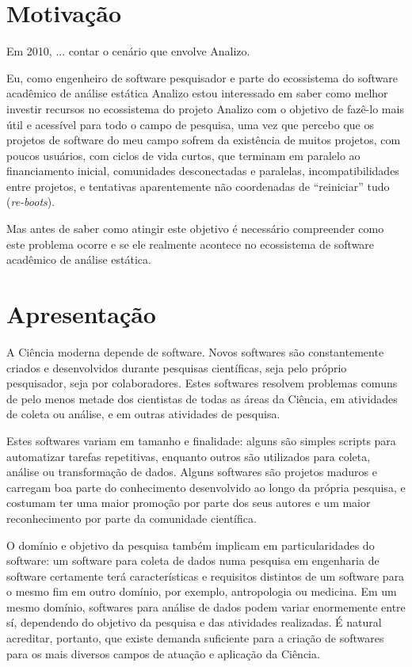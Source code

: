 
\section{Motivação}

Em 2010, ... contar o cenário que envolve Analizo.


Eu, como engenheiro de software pesquisador e parte do ecossistema do software
acadêmico de análise estática Analizo estou interessado em saber como melhor
investir recursos no ecossistema do projeto Analizo com o objetivo de fazê-lo
mais útil e acessível para todo o campo de pesquisa, uma vez que percebo que os
projetos de software do meu campo sofrem da existência de muitos projetos, com
poucos usuários, com ciclos de vida curtos, que terminam em paralelo ao
financiamento inicial, comunidades desconectadas e paralelas,
incompatibilidades entre projetos, e tentativas aparentemente não coordenadas
de ``reiniciar'' tudo ({\it re-boots}).

Mas antes de saber como atingir este objetivo é necessário compreender como
este problema ocorre e se ele realmente acontece no ecossistema de software
acadêmico de análise estática.


\section{Apresentação}

A Ciência moderna depende de software. Novos softwares são constantemente
criados e desenvolvidos durante pesquisas científicas, seja pelo próprio pesquisador,
seja por colaboradores. 
Estes softwares resolvem problemas comuns de pelo menos metade dos cientistas 
de todas as áreas da Ciência, em atividades de coleta ou análise, 
e em outras atividades de pesquisa.

Estes softwares variam em tamanho e finalidade: alguns são simples
scripts para automatizar tarefas repetitivas, enquanto outros são utilizados para
coleta, análise ou transformação de dados. Alguns softwares são projetos maduros e
carregam boa parte do conhecimento desenvolvido ao longo da própria pesquisa, e
costumam ter uma maior promoção por parte dos seus autores e um maior
reconhecimento por parte da comunidade científica.

O domínio e objetivo da pesquisa também implicam em particularidades do software: 
um software para coleta de dados numa pesquisa em engenharia de
software certamente terá características e requisitos distintos de um software
para o mesmo fim em outro domínio, por exemplo,  antropologia ou medicina.
Em um mesmo domínio, softwares para análise de dados podem variar
enormemente entre sí, dependendo do objetivo da pesquisa e das atividades realizadas.
\'{E} natural acreditar, portanto, que existe demanda suficiente para a
criação de softwares para os mais diversos campos de atuação e aplicação da
Ciência.

